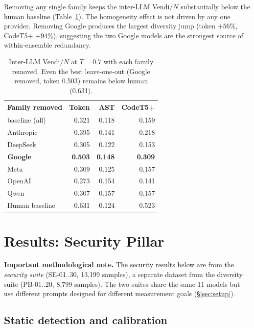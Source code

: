 \documentclass{article}
\begin{document}
Removing any single family keeps the inter-LLM Vendi$/N$ substantially
below the human baseline (Table~\ref{tab:fam}). The homogeneity effect is
not driven by any one provider. Removing Google produces the largest
diversity jump (token $+56\%$, CodeT5+ $+94\%$), suggesting the two
Google models are the strongest source of within-ensemble redundancy.

\begin{table}[h]
\centering\small
\begin{tabular}{lrrr}
\toprule
Family removed & Token & AST & CodeT5+ \\
\midrule
baseline (all) & 0.321 & 0.118 & 0.159 \\
Anthropic      & 0.395 & 0.141 & 0.218 \\
DeepSeek       & 0.305 & 0.122 & 0.153 \\
\textbf{Google}& \textbf{0.503} & \textbf{0.148} & \textbf{0.309} \\
Meta           & 0.309 & 0.125 & 0.157 \\
OpenAI         & 0.273 & 0.154 & 0.141 \\
Qwen           & 0.307 & 0.157 & 0.157 \\
\midrule
Human baseline & 0.631 & 0.124 & 0.523 \\
\bottomrule
\end{tabular}
\caption{Inter-LLM Vendi$/N$ at $T{=}0.7$ with each family removed. Even
the best leave-one-out (Google removed, token 0.503) remains below human
(0.631).}
\label{tab:fam}
\end{table}

\section{Results: Security Pillar}
\label{sec:results-security}

\textbf{Important methodological note.} The security results below are from
the \emph{security suite} (SE-01..30, 13,199 samples), a separate dataset
from the diversity suite (PB-01..20, 8,799 samples). The two suites share
the same 11 models but use different prompts designed for different
measurement goals (\S\ref{sec:setup}).

\subsection{Static detection and calibration}
\end{document}
